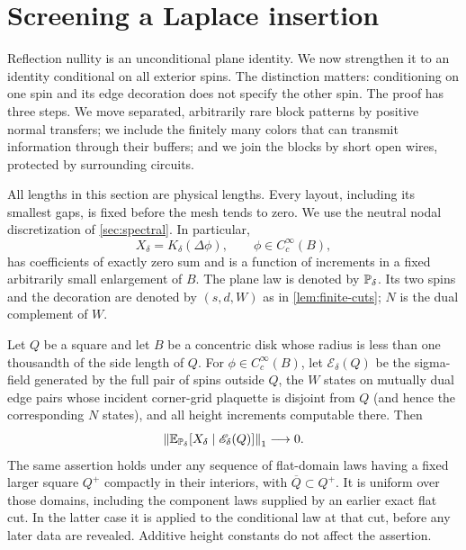 \section{Screening a Laplace insertion}
\label{sec:screening}

Reflection nullity is an unconditional plane identity. We now strengthen it
to an identity conditional on all exterior spins. The distinction matters:
conditioning on one spin and its edge decoration does not specify the other
spin. The proof has three steps. We move separated, arbitrarily rare block
patterns by positive normal transfers; we include the finitely many colors
that can transmit information through their buffers; and we join the blocks
by short open wires, protected by surrounding circuits.

All lengths in this section are physical lengths. Every layout, including
its smallest gaps, is fixed before the mesh tends to zero. We use the neutral
nodal discretization of \cref{sec:spectral}. In particular,
\begin{equation}
 X_\delta=K_\delta(\Delta\phi),\qquad
 \phi\in C_c^\infty(B),
 \label{eq:screen-insertion}
\end{equation}
has coefficients of exactly zero sum and is a function of increments in a
fixed arbitrarily small enlargement of $B$. The plane law is denoted by
$\P_\delta$. Its two spins and the decoration are denoted by $(s,d,W)$ as
in \cref{lem:finite-cuts}; $N$ is the dual complement of $W$.

\begin{proposition}
\label{prop:screened-orthogonality}
Let $Q$ be a square and let $B$ be a concentric disk whose radius is less
than one thousandth of the side length of $Q$. For
$\phi\in C_c^\infty(B)$, let $\mathscr E_\delta(Q)$ be the sigma-field
generated by the full pair of spins outside $Q$, the $W$ states on
mutually dual edge pairs whose incident corner-grid plaquette is disjoint
from $Q$ (and hence the corresponding $N$ states), and all height
increments computable there. Then
\begin{equation}
 \left\|\E_{\P_\delta}
       [X_\delta\mid\mathscr E_\delta(Q)]\right\|_1
       \longrightarrow0.
 \label{eq:plane-exterior-orthogonality}
\end{equation}
The same assertion holds under any sequence of flat-domain laws having a
fixed larger square $Q^+$ compactly in their interiors, with
$\overline Q\subset Q^+$. It is uniform over those domains, including
the component laws supplied by an earlier exact flat cut. In the latter
case it is applied to the conditional law at that cut, before any later
data are revealed. Additive height constants do not affect the assertion.
\end{proposition}

